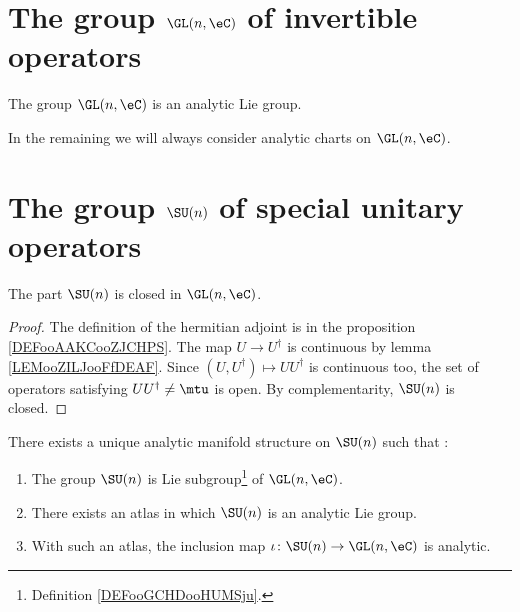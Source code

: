 \section{The group \texorpdfstring{$ \GL(n,\eC)$}{GLnC} of invertible operators}

\begin{proposition}     \label{PROPooWRVKooLfqLfV}
    The group \( \GL(n,\eC)\) is an analytic Lie group.
\end{proposition}

In the remaining we will always consider analytic charts on \( \GL(n,\eC)\).

\section{The group \texorpdfstring{$ \SU(n)$}{SUn} of special unitary operators}

\begin{lemma}        \label{LEMooKFQOooBVtyoW}
    The part \( \SU(n)\) is closed in \( \GL(n,\eC)\).
\end{lemma}

\begin{proof}
    The definition of the hermitian adjoint is in the proposition \ref{DEFooAAKCooZJCHPS}. The map \( U\to U^{\dag}\) is continuous by lemma \ref{LEMooZILJooFfDEAF}. Since \( (U,U^{\dag})\mapsto UU^{\dag}\) is continuous too, the set of operators satisfying \( UU^{\dag}\neq\mtu\) is open. By complementarity, \( \SU(n)\) is closed.
\end{proof}

\begin{proposition}        \label{PROPooPXRJooLNnMFn}
    There exists a unique analytic manifold structure on \( \SU(n)\) such that :
    \begin{enumerate}
        \item
            The group \( \SU(n)\) is Lie subgroup\footnote{Definition \ref{DEFooGCHDooHUMSju}.} of \( \GL(n,\eC)\).
        \item
            There exists an atlas in which \( \SU(n)\) is an analytic Lie group.
        \item
            With such an atlas, the inclusion map \( \iota\colon \SU(n)\to \GL(n,\eC)\) is analytic.
    \end{enumerate}
\end{proposition}

